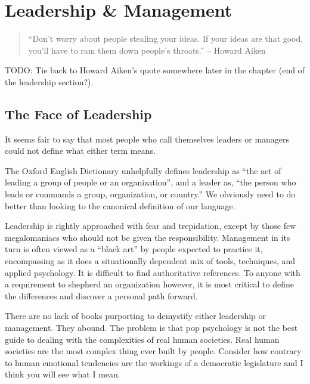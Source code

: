 %
%

\chapter{Leadership \& Management}

\begin{quote}
``Don't worry about people stealing your ideas. If your ideas are that good, you'll have to ram them down people's throats.'' -- Howard Aiken
\end{quote}

TODO: Tie back to Howard Aiken's quote somewhere later in the chapter (end of the leadership section?).


\section{The Face of Leadership}

It seems fair to say that most people who call themselves leaders or managers could not define what either term means.

The Oxford English Dictionary unhelpfully defines leadership as ``the act of leading a group of people or an organization'', and a leader as, ``the person who leads or commands a group, organization, or country.'' We obviously need to do better than looking to the canonical definition of our language.

Leadership is rightly approached with fear and trepidation, except by those few megalomaniacs who should not be given the responsibility. Management in its turn is often viewed as a ``black art'' by people expected to practice it, encompassing as it does a situationally dependent mix of tools, techniques, and applied psychology. It is difficult to find authoritative references. To anyone with a requirement to shepherd an organization however, it is most critical to define the differences and discover a personal path forward.

There are no lack of books purporting to demystify either leadership or management.  They abound.  The problem is that pop psychology is not the best guide to dealing with the complexities of real human societies.  Real human societies are the most complex thing ever built by people. Consider how contrary to human emotional tendencies are the workings of a democratic legislature and I think you will see what I mean.

